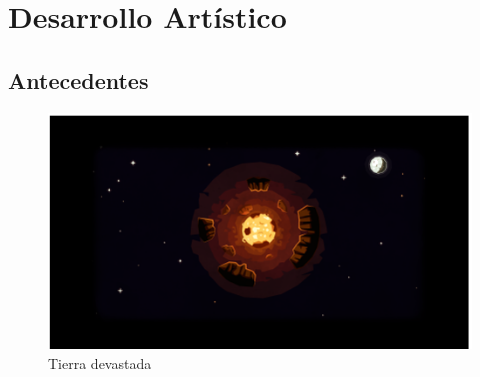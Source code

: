 

\chapter{Desarrollo Artístico}
\section{Antecedentes}


\begin{figure}[H]
	\centering
	\includegraphics[scale=0.80]{imagenes/terraDevastada.png}
	\caption{\label{fig:TierraDevastada}Tierra devastada}
\end{figure}


	
 

 


 






